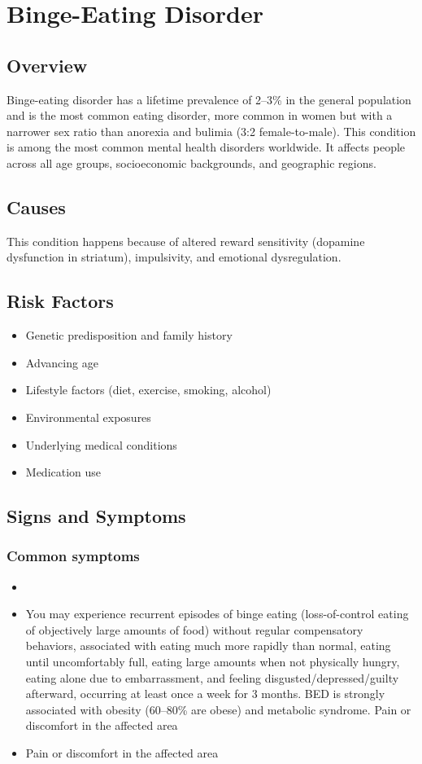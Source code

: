 \chapter{Binge-Eating Disorder}
\label{sec:Binge-Eating Disorder}

\section{Overview}
Binge-eating disorder has a lifetime prevalence of 2--3\% in the general population and is the most common eating disorder, more common in women but with a narrower sex ratio than anorexia and bulimia (3:2 female-to-male). This condition is among the most common mental health disorders worldwide. It affects people across all age groups, socioeconomic backgrounds, and geographic regions.
\section{Causes}
This condition happens because of altered reward sensitivity (dopamine dysfunction in striatum), impulsivity, and emotional dysregulation.     
\section{Risk Factors}

\begin{itemize}[noitemsep]
  \item Genetic predisposition and family history
  \item Advancing age
  \item Lifestyle factors (diet, exercise, smoking, alcohol)
  \item Environmental exposures
  \item Underlying medical conditions
  \item Medication use
\end{itemize}
\section{Signs and Symptoms}

\subsection{Common symptoms}
\begin{itemize}[noitemsep]
  \item \item You may experience recurrent episodes of binge eating (loss-of-control eating of objectively large amounts of food) without regular compensatory behaviors, associated with eating much more rapidly than normal, eating until uncomfortably full, eating large amounts when not physically hungry, eating alone due to embarrassment, and feeling disgusted/depressed/guilty afterward, occurring at least once a week for 3 months. BED is strongly associated with obesity (60--80\% are obese) and metabolic syndrome. Pain or discomfort in the affected area    \item Pain or discomfort in the affected area
  \end{itemize}

